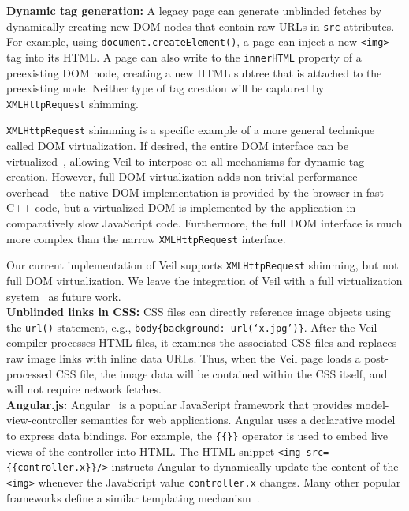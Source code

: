 \noindent
{\bf Dynamic tag generation:} A legacy page can generate
unblinded fetches by dynamically creating new DOM nodes
that contain raw URLs in \texttt{src} attributes. For
example, using \texttt{document.createElement()}, a page
can inject a new \texttt{<img>} tag into its HTML\@. A
page can also write to the \texttt{innerHTML} property
of a preexisting DOM node, creating a new HTML subtree
that is attached to the preexisting node. Neither type of
tag creation will be captured by \texttt{XMLHttpRequest}
shimming.

\texttt{XMLHttpRequest} shimming is a specific example
of a more general technique called DOM virtualization.
If desired, the entire DOM interface can be
virtualized~\cite{psj,treehouse,jigsaw}, allowing Veil to interpose
on all mechanisms for dynamic tag creation. However,
full DOM virtualization adds non-trivial performance
overhead---the native DOM implementation is provided by
the browser in fast C++ code, but a virtualized DOM is
implemented by the application in comparatively slow JavaScript
code. Furthermore, the full DOM interface is much more
complex than the narrow \texttt{XMLHttpRequest} interface. 

Our current implementation of Veil supports
\texttt{XMLHttpRequest} shimming, but not full DOM
virtualization. We leave the integration of Veil with
a full virtualization system~\cite{treehouseGit} as
future work.\\

\noindent
{\bf Unblinded links in CSS:} CSS files can directly
reference image objects using the \texttt{url()}
statement, e.g., \texttt{body\{background: url(`x.jpg')\}}.
After the Veil compiler processes HTML files, it
examines the associated CSS files and replaces raw
image links with inline data URLs. Thus, when the
Veil page loads a post-processed CSS file, the image
data will be contained within the CSS itself, and will
not require network fetches.\\

\noindent
{\bf Angular.js:} Angular~\cite{angular} is a popular
JavaScript framework that provides model-view-controller
semantics for web applications. Angular uses a
declarative model to express data bindings. For
example, the \texttt{\{\{\}\}} operator is used to embed
live views of the controller into HTML\@. The HTML
snippet \texttt{<img src=\{\{controller.x\}\}/>} instructs
Angular to dynamically update the content of the
\texttt{<img>} whenever the JavaScript value
\texttt{controller.x} changes. Many other popular
frameworks define a similar templating mechanism~\cite{backbone,kendo,ember}.

